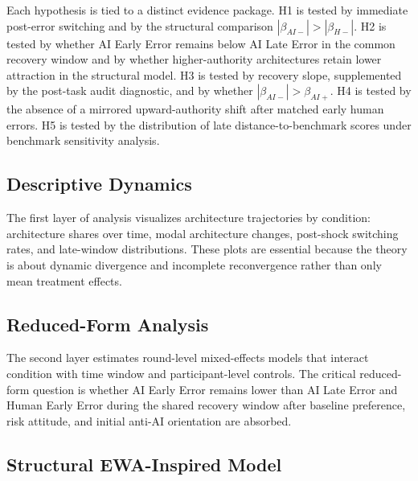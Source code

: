 \documentclass[man,natbib]{apa7}
\begin{document}
Each hypothesis is tied to a distinct evidence package. H1 is tested by immediate post-error switching and by the structural comparison $|\beta_{AI-}| > |\beta_{H-}|$. H2 is tested by whether AI Early Error remains below AI Late Error in the common recovery window and by whether higher-authority architectures retain lower attraction in the structural model. H3 is tested by recovery slope, supplemented by the post-task audit diagnostic, and by whether $|\beta_{AI-}| > \beta_{AI+}$. H4 is tested by the absence of a mirrored upward-authority shift after matched early human errors. H5 is tested by the distribution of late distance-to-benchmark scores under benchmark sensitivity analysis.

\subsection{Descriptive Dynamics}

The first layer of analysis visualizes architecture trajectories by condition: architecture shares over time, modal architecture changes, post-shock switching rates, and late-window distributions. These plots are essential because the theory is about dynamic divergence and incomplete reconvergence rather than only mean treatment effects.

\subsection{Reduced-Form Analysis}

The second layer estimates round-level mixed-effects models that interact condition with time window and participant-level controls. The critical reduced-form question is whether AI Early Error remains lower than AI Late Error and Human Early Error during the shared recovery window after baseline preference, risk attitude, and initial anti-AI orientation are absorbed.

\subsection{Structural EWA-Inspired Model}
\end{document}
